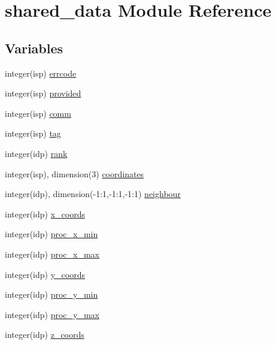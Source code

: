\hypertarget{namespaceshared__data}{}\section{shared\+\_\+data Module Reference}
\label{namespaceshared__data}
\subsection*{Variables}
\begin{DoxyCompactItemize}
\item 
integer(isp) \hyperlink{namespaceshared__data_abaa407d5754648a7f9982743e6f66cea}{errcode}
\item 
integer(isp) \hyperlink{namespaceshared__data_a8d2ebafd1706311a79669ec57417490c}{provided}
\item 
integer(isp) \hyperlink{namespaceshared__data_a7487068a99e504a127a343402734b57b}{comm}
\item 
integer(isp) \hyperlink{namespaceshared__data_a7877a929286571631efc41c30444e7cd}{tag}
\item 
integer(idp) \hyperlink{namespaceshared__data_a7e8de99f54b7f7fcc513be2975546b9e}{rank}
\item 
integer(isp), dimension(3) \hyperlink{namespaceshared__data_afafd7a6c030e4a324d60bdaf80cdf1fc}{coordinates}
\item 
integer(idp), dimension(-\/1\+:1,-\/1\+:1,-\/1\+:1) \hyperlink{namespaceshared__data_a9b751058861424f3b06e476705e37f2a}{neighbour}
\item 
integer(idp) \hyperlink{namespaceshared__data_ad2930b2e73ee090643c12e9cb17176ec}{x\+\_\+coords}
\item 
integer(idp) \hyperlink{namespaceshared__data_a947fbeedc2c4451e5d740f523ec69a1c}{proc\+\_\+x\+\_\+min}
\item 
integer(idp) \hyperlink{namespaceshared__data_adb07cb664ff097546be35d850bf4768a}{proc\+\_\+x\+\_\+max}
\item 
integer(idp) \hyperlink{namespaceshared__data_a89070910fe26fb1d33016351a3a1fd03}{y\+\_\+coords}
\item 
integer(idp) \hyperlink{namespaceshared__data_a5d06df53dc214205e963f155e25e7192}{proc\+\_\+y\+\_\+min}
\item 
integer(idp) \hyperlink{namespaceshared__data_aba8da0c99ab004ea8cbb5a5da24178fb}{proc\+\_\+y\+\_\+max}
\item 
integer(idp) \hyperlink{namespaceshared__data_a208c54ff19ecd9211442644004e44a79}{z\+\_\+coords}

\end{DoxyCompactItemize}
